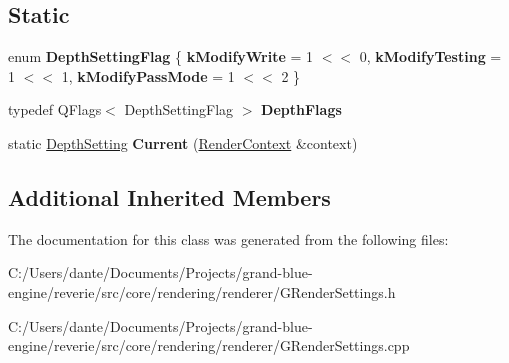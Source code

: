 \subsection*{Static}
\begin{DoxyCompactItemize}
\item 
\mbox{\label{classrev_1_1_depth_setting_aa3308c2a209ed3383ca7f5ce67acc692}} 
enum {\bfseries Depth\+Setting\+Flag} \{ {\bfseries k\+Modify\+Write} = 1 $<$$<$ 0, 
{\bfseries k\+Modify\+Testing} = 1 $<$$<$ 1, 
{\bfseries k\+Modify\+Pass\+Mode} = 1 $<$$<$ 2
 \}
\item 
\mbox{\label{classrev_1_1_depth_setting_aebf510b0e1b0aca2e1459bfbeec32d1f}} 
typedef Q\+Flags$<$ Depth\+Setting\+Flag $>$ {\bfseries Depth\+Flags}
\item 
\mbox{\label{classrev_1_1_depth_setting_ac6f4c3c20054c7a060518e17541c893a}} 
static \mbox{\hyperlink{classrev_1_1_depth_setting}{Depth\+Setting}} {\bfseries Current} (\mbox{\hyperlink{classrev_1_1_render_context}{Render\+Context}} \&context)
\end{DoxyCompactItemize}
\subsection*{Additional Inherited Members}


The documentation for this class was generated from the following files\+:\begin{DoxyCompactItemize}
\item 
C\+:/\+Users/dante/\+Documents/\+Projects/grand-\/blue-\/engine/reverie/src/core/rendering/renderer/G\+Render\+Settings.\+h\item 
C\+:/\+Users/dante/\+Documents/\+Projects/grand-\/blue-\/engine/reverie/src/core/rendering/renderer/G\+Render\+Settings.\+cpp\end{DoxyCompactItemize}
